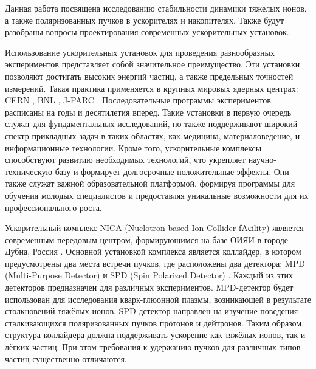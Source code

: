 \par Данная работа посвящена исследованию стабильности динамики тяжелых ионов, а также поляризованных пучков в ускорителях и накопителях. Также будут разобраны вопросы проектирования современных ускорительных установок.

\par Использование ускорительных установок для проведения разнообразных экспериментов представляет собой значительное преимущество. Эти установки позволяют достигать высоких энергий частиц, а также предельных точностей измерений. Такая практика применяется в крупных мировых ядерных центрах: CERN \cite{lhc:heavy_ions}, BNL \cite{rhic:design}, J-PARC \cite{j-park}. Последовательные программы экспериментов расписаны на годы и десятилетия вперед. Такие установки в первую очередь служат для фундаментальных исследований, но также поддерживают широкий спектр прикладных задач в таких областях, как медицина, материаловедение, и информационные технологии. Кроме того, ускорительные комплексы способствуют развитию необходимых технологий, что укрепляет научно-техническую базу и формирует долгосрочные положительные эффекты. Они также служат важной образовательной платформой, формируя программы для обучения молодых специалистов и предоставляя уникальные возможности для их профессионального роста. 

\par Ускорительный комплекс NICA (Nuclotron-based Ion Collider fAсility) является современным передовым центром, формирующимся на базе ОИЯИ в городе Дубна, Россия \cite{nuclotron24}. Основной установкой комплекса является коллайдер, в котором предусмотрены два места встречи пучков, где расположены два детектора: MPD (Multi-Purpose Detector) \cite{MPD} и SPD (Spin Polarized Detector) \cite{Ladygin:SPD}. Каждый из этих детекторов предназначен для различных экспериментов. MPD-детектор будет использован для исследования кварк-глюонной плазмы, возникающей в результате столкновений тяжёлых ионов. SPD-детектор направлен на изучение поведения сталкивающихся поляризованных пучков протонов и дейтронов. Таким образом, структура коллайдера должна поддерживать ускорение как тяжёлых ионов, так и лёгких частиц. При этом требования к удержанию пучков для различных типов частиц существенно отличаются.

